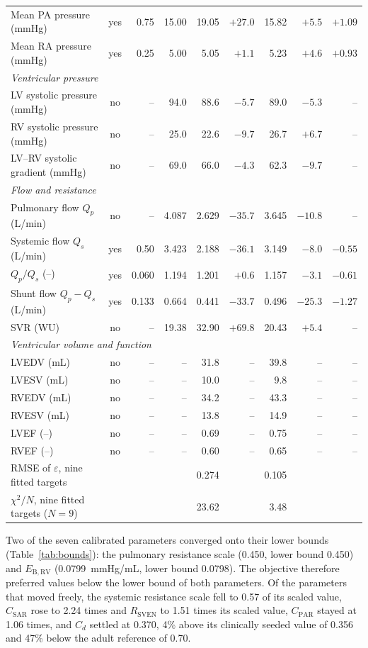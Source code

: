 \documentclass{article}
\begin{document}
\begin{table}[!htbp]
{\begin{tabular}{lcrrrrrrr}
Mean PA pressure (mmHg) & yes & 0.75 & 15.00 & 19.05 & $+27.0$ & 15.82 & $+5.5$ & $+1.09$ \\
Mean RA pressure (mmHg) & yes & 0.25 & 5.00 & 5.05 & $+1.1$ & 5.23 & $+4.6$ & $+0.93$ \\
\multicolumn{9}{l}{\emph{Ventricular pressure}} \\
LV systolic pressure (mmHg) & no & -- & 94.0 & 88.6 & $-5.7$ & 89.0 & $-5.3$ & -- \\
RV systolic pressure (mmHg) & no & -- & 25.0 & 22.6 & $-9.7$ & 26.7 & $+6.7$ & -- \\
LV--RV systolic gradient (mmHg) & no & -- & 69.0 & 66.0 & $-4.3$ & 62.3 & $-9.7$ & -- \\
\multicolumn{9}{l}{\emph{Flow and resistance}} \\
Pulmonary flow $Q_p$ (L/min) & no & -- & 4.087 & 2.629 & $-35.7$ & 3.645 & $-10.8$ & -- \\
Systemic flow $Q_s$ (L/min) & yes & 0.50 & 3.423 & 2.188 & $-36.1$ & 3.149 & $-8.0$ & $-0.55$ \\
$Q_p/Q_s$ (--) & yes & 0.060 & 1.194 & 1.201 & $+0.6$ & 1.157 & $-3.1$ & $-0.61$ \\
Shunt flow $Q_p - Q_s$ (L/min) & yes & 0.133 & 0.664 & 0.441 & $-33.7$ & 0.496 & $-25.3$ & $-1.27$ \\
SVR (WU) & no & -- & 19.38 & 32.90 & $+69.8$ & 20.43 & $+5.4$ & -- \\
\multicolumn{9}{l}{\emph{Ventricular volume and function}} \\
LVEDV (mL) & no & -- & -- & 31.8 & -- & 39.8 & -- & -- \\
LVESV (mL) & no & -- & -- & 10.0 & -- & 9.8 & -- & -- \\
RVEDV (mL) & no & -- & -- & 34.2 & -- & 43.3 & -- & -- \\
RVESV (mL) & no & -- & -- & 13.8 & -- & 14.9 & -- & -- \\
LVEF (--) & no & -- & -- & 0.69 & -- & 0.75 & -- & -- \\
RVEF (--) & no & -- & -- & 0.60 & -- & 0.65 & -- & -- \\
\midrule
RMSE of $\varepsilon$, nine fitted targets & & & & 0.274 & & 0.105 & & \\
$\chi^2/N$, nine fitted targets ($N=9$) & & & & 23.62 & & 3.48 & & \\
\bottomrule
\end{tabular}}
\end{table}

Two of the seven calibrated parameters converged onto their lower bounds (Table~\ref{tab:bounds}): the pulmonary resistance scale (0.450, lower bound 0.450) and $E_{\mathrm{B,RV}}$ (0.0799~mmHg/mL, lower bound 0.0798). The objective therefore preferred values below the lower bound of both parameters. Of the parameters that moved freely, the systemic resistance scale fell to 0.57 of its scaled value, $C_{\mathrm{SAR}}$ rose to 2.24 times and $R_{\mathrm{SVEN}}$ to 1.51 times its scaled value, $C_{\mathrm{PAR}}$ stayed at 1.06 times, and $C_d$ settled at 0.370, 4\% above its clinically seeded value of 0.356 and 47\% below the adult reference of 0.70.
\end{document}
